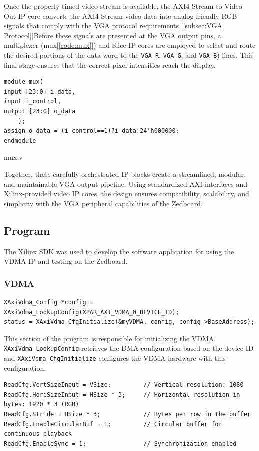 \documentclass{article}
\begin{document}
Once the properly timed video stream is available, the AXI4-Stream to Video Out IP core converts the AXI4-Stream video data into analog-friendly RGB signals that comply with the VGA protocol requirements [\cref{subsec:VGA Protocol}]Before these signals are presented at the VGA output pins, a multiplexer (mux[\cref{code:mux}]) and Slice IP cores are employed to select and route the desired portions of the data word to the \verb|VGA_R|, \verb|VGA_G|, and \verb|VGA_B|) lines. This final stage ensures that the correct pixel intensities reach the display.

\begin{listing}[H]
\begin{verbatim}
module mux(
input [23:0] i_data,
input i_control,
output [23:0] o_data
    );
assign o_data = (i_control==1)?i_data:24'h000000;
endmodule
\end{verbatim}
\caption{mux.v}
\label{code:mux}
\end{listing}

Together, these carefully orchestrated IP blocks create a streamlined, modular, and maintainable VGA output pipeline. Using standardized AXI interfaces and Xilinx-provided video IP cores, the design ensures compatibility, scalability, and simplicity with the VGA peripheral capabilities of the Zedboard.

\subsection{Program}

The Xilinx SDK was used to develop the software application \cite{noauthor_vipinkmenonvga_nodate} for using the VDMA IP and testing on the Zedboard.

\subsubsection{VDMA}

\begin{verbatim}
XAxiVdma_Config *config = XAxiVdma_LookupConfig(XPAR_AXI_VDMA_0_DEVICE_ID);
status = XAxiVdma_CfgInitialize(&myVDMA, config, config->BaseAddress);
\end{verbatim}
This section of the program is responsible for initializing the VDMA. \verb|XAxiVdma_LookupConfig| retrieves the DMA configuration based on the device ID and \verb|XAxiVdma_CfgInitialize| configures the VDMA hardware with this configuration.

\begin{verbatim}
ReadCfg.VertSizeInput = VSize;         // Vertical resolution: 1080
ReadCfg.HoriSizeInput = HSize * 3;     // Horizontal resolution in bytes: 1920 * 3 (RGB)
ReadCfg.Stride = HSize * 3;            // Bytes per row in the buffer
ReadCfg.EnableCircularBuf = 1;         // Circular buffer for continuous playback
ReadCfg.EnableSync = 1;                // Synchronization enabled
\end{verbatim}
\end{document}
